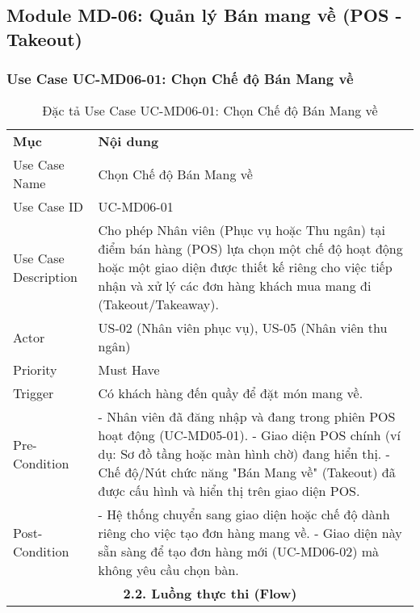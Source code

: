 \subsection{Module MD-06: Quản lý Bán mang về (POS - Takeout)}

\subsubsection{Use Case UC-MD06-01: Chọn Chế độ Bán Mang về}

\begin{longtable}{|m{4cm}|p{11cm}|}
\caption{Đặc tả Use Case UC-MD06-01: Chọn Chế độ Bán Mang về} \label{tab:uc_md06_01} \\
\hline

\endhead %
\hline
\endfoot %
\hline
\endlastfoot %
\multicolumn{2}{|c|}{\textbf{2.1. Tóm tắt (Summary)}} \\
\hline
\textbf{Mục} & \textbf{Nội dung} \\
\hline
Use Case Name & Chọn Chế độ Bán Mang về \\
\hline
Use Case ID & UC-MD06-01 \\
\hline
Use Case Description & Cho phép Nhân viên (Phục vụ hoặc Thu ngân) tại điểm bán hàng (POS) lựa chọn một chế độ hoạt động hoặc một giao diện được thiết kế riêng cho việc tiếp nhận và xử lý các đơn hàng khách mua mang đi (Takeout/Takeaway). \\
\hline
Actor & US-02 (Nhân viên phục vụ), US-05 (Nhân viên thu ngân) \\
\hline
Priority & Must Have \\
\hline
Trigger & Có khách hàng đến quầy để đặt món mang về. \\
\hline
Pre-Condition & - Nhân viên đã đăng nhập và đang trong phiên POS hoạt động (UC-MD05-01). \newline - Giao diện POS chính (ví dụ: Sơ đồ tầng hoặc màn hình chờ) đang hiển thị. \newline - Chế độ/Nút chức năng "Bán Mang về" (Takeout) đã được cấu hình và hiển thị trên giao diện POS. \\
\hline
Post-Condition & - Hệ thống chuyển sang giao diện hoặc chế độ dành riêng cho việc tạo đơn hàng mang về. \newline - Giao diện này sẵn sàng để tạo đơn hàng mới (UC-MD06-02) mà không yêu cầu chọn bàn. \\
\hline
\multicolumn{2}{|c|}{\textbf{2.2. Luồng thực thi (Flow)}} \\

\end{longtable}
